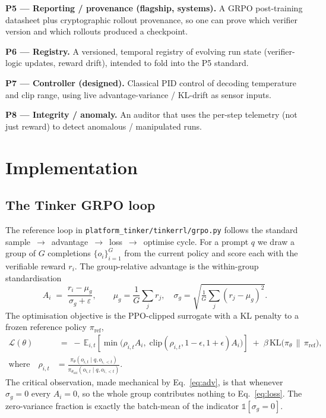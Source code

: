 \documentclass[11pt,a4paper]{article}
\begin{document}
\textbf{P5 --- Reporting / provenance (flagship, systems).} A GRPO post-training
datasheet plus cryptographic rollout provenance, so one can prove which verifier
version and which rollouts produced a checkpoint.


\textbf{P6 --- Registry.} A versioned, temporal registry of evolving run state
(verifier-logic updates, reward drift), intended to fold into the P5 standard.

\textbf{P7 --- Controller (designed).} Classical PID control of decoding temperature
and clip range, using live advantage-variance / KL-drift as sensor inputs.

\textbf{P8 --- Integrity / anomaly.} An auditor that uses the per-step telemetry
(not just reward) to detect anomalous / manipulated runs.

\section{Implementation}
\label{sec:impl}

\subsection{The Tinker GRPO loop}


The reference loop in \texttt{platform\_tinker/tinkerrl/grpo.py} follows the standard
sample~$\rightarrow$~advantage~$\rightarrow$~loss~$\rightarrow$~optimise cycle.
For a prompt $q$ we draw a group of $G$ completions $\{o_i\}_{i=1}^{G}$ from the
current policy and score each with the verifiable reward $r_i$. The
group-relative advantage is the within-group standardisation
\begin{equation}
A_i \;=\; \frac{r_i - \mu_g}{\sigma_g + \varepsilon},
\qquad
\mu_g = \frac{1}{G}\sum_{j} r_j,\quad
\sigma_g = \sqrt{\tfrac{1}{G}\sum_j (r_j-\mu_g)^2}.
\label{eq:adv}
\end{equation}
The optimisation objective is the PPO-clipped surrogate with a KL penalty to a
frozen reference policy $\pi_{\mathrm{ref}}$,
\begin{align}
\mathcal{L}(\theta) &\;=\;
-\,\mathbb{E}_{i,t}\!\left[
\min\!\big(\rho_{i,t}A_i,\;
\mathrm{clip}(\rho_{i,t},1-\epsilon,1+\epsilon)A_i\big)
\right]
\;+\; \beta\, \mathrm{KL}\!\big(\pi_\theta \,\|\, \pi_{\mathrm{ref}}\big),
\label{eq:loss}\\[0.2em]
\text{where}\quad
\rho_{i,t} &=\frac{\pi_\theta(o_{i,t}\mid q,o_{i,<t})}{\pi_{\theta_{\mathrm{old}}}(o_{i,t}\mid q,o_{i,<t})}.
\nonumber
\end{align}
The critical observation, made mechanical by Eq.~\eqref{eq:adv}, is that whenever
$\sigma_g = 0$ every $A_i = 0$, so the whole group contributes nothing to
Eq.~\eqref{eq:loss}. The zero-variance fraction is exactly the batch-mean of the
indicator $\mathbb{1}[\sigma_g = 0]$.
\end{document}

